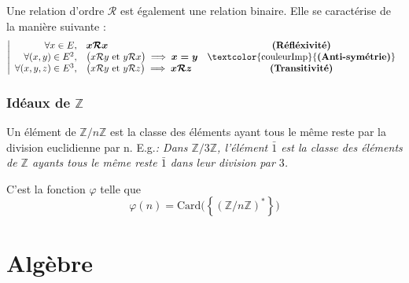 \documentclass[11pt,a4paper,fleqn,pdftex]{report}
\begin{document}
\begin{dfn}
Une relation d'ordre $\mathcal{R}$ est également une relation binaire. Elle se caractérise de la manière suivante : 
\begin{equation}
\left|
\begin{array}{r l c}
\forall x \in E,& \boldsymbol{x\mathcal{R}x} & \text{\textbf{(Réfléxivité)}}\\
\forall (x,y) \in E^2, & \big( x\mathcal{R}y \text{ et } y\mathcal{R}x \big) \implies \boldsymbol{x=y} & \text{\textcolor{couleurImp}{\textbf{(Anti-symétrie)}}}\\
\forall (x,y,z) \in E^3, & \big( x\mathcal{R}y \text{ et } y\mathcal{R}z \big) \implies \boldsymbol{x\mathcal{R}z} & \text{\textbf{(Transitivité)}}
\end{array}
\right.
\end{equation}
\end{dfn}


\section{Idéaux de $\mathbb{Z}$}
\begin{dfn}
Un élément de $\mathbb{Z}/ n\mathbb{Z}$ est la classe des éléments ayant tous le même reste par la division euclidienne par n.\newline
E.g.\textit{: Dans $\mathbb{Z}/3\mathbb{Z}$, l'élément $\bar{1}$ est la classe des éléments de $\mathbb{Z}$ ayants tous le même reste $\bar{1}$ dans leur division par $3$.}
\end{dfn}


\begin{theorem}
C'est la fonction $\varphi$ telle que 
\[
    \varphi (n) = \mathrm{Card}\big( \left\lbrace \left( \mathbb{Z} / n \mathbb{Z} \right) ^{*} \right\rbrace \big)
\]
\end{theorem}

\part{Algèbre}
\end{document}
